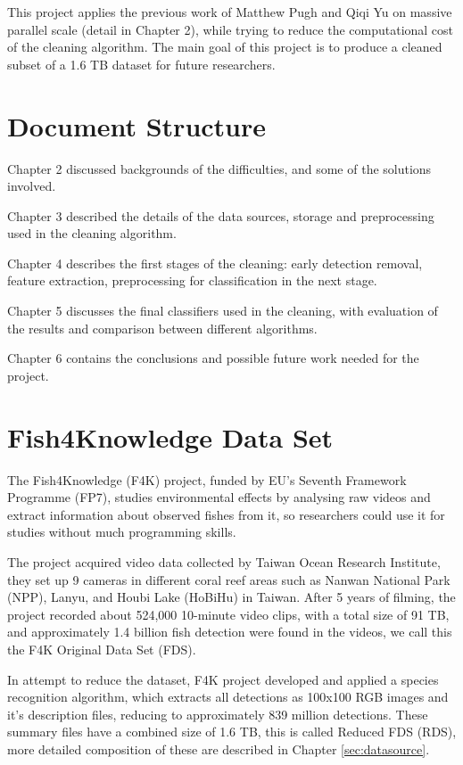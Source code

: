\documentclass[bsc,logo,twoside,fullspacing,parskip]{infthesis}
\begin{document}

This project applies the previous work of Matthew Pugh\cite{P1} and Qiqi Yu\cite{P3} on massive parallel scale (detail in Chapter 2), while trying to reduce the computational cost of the cleaning algorithm. The main goal of this project is to produce a cleaned subset of a 1.6 TB dataset for future researchers.

\section{Document Structure}

Chapter 2 discussed backgrounds of the difficulties, and some of the solutions involved.

Chapter 3 described the details of the data sources, storage and preprocessing used in the cleaning algorithm.

Chapter 4 describes the first stages of the cleaning: early detection removal, feature extraction, preprocessing for classification in the next stage.

Chapter 5 discusses the final classifiers used in the cleaning, with evaluation of the results and comparison between different algorithms. 

Chapter 6 contains the conclusions and possible future work needed for the project.

\section{Fish4Knowledge Data Set}

The Fish4Knowledge (F4K) project, funded by EU's Seventh Framework Programme (FP7), studies environmental effects by analysing raw videos and extract information about observed fishes from it, so researchers could use it for studies without much programming skills. 

The project acquired video data collected by Taiwan Ocean Research Institute, they set up 9 cameras in different coral reef areas such as Nanwan National Park (NPP), Lanyu, and Houbi Lake (HoBiHu) in Taiwan. 
After 5 years of filming, the project recorded about 524,000 10-minute video clips, with a total size of 91 TB, and approximately 1.4 billion fish detection were found in the videos, we call this the F4K Original Data Set (FDS).

In attempt to reduce the dataset, F4K project developed and applied a species recognition algorithm, which extracts all detections as 100x100 RGB images and it's description files, reducing to approximately 839 million detections. These summary files have a combined size of 1.6 TB, this is called Reduced FDS (RDS), more detailed composition of these are described in Chapter \ref{sec:datasource}.
\end{document}
